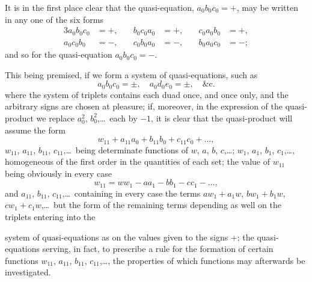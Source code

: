 \documentclass[11pt,a4paper]{book}
\begin{document}
It is in the first place clear that the quasi-equation, $a_0 b_0 c_0 = +$, may be written in any one of the six forms
\begin{alignat*}{3}
a_0 b_0 c_0 &= +, \quad& b_0 c_0 a_0 &= +, \quad& c_0 a_0 b_0 &= +,\\
a_0 c_0 b_0 &= -, \quad& c_0 b_0 a_0 &= -, \quad& b_0 a_0 c_0 &= -;
\end{alignat*}
and so for the quasi-equation $a_0 b_0 c_0 = -$.

\newpage
\setcounter{page}{50}

This being premised, if we form a system of quasi-equations, such as
\[
a_0 b_0 c_0 = \pm, \quad a_0 d_0 e_0 = \pm, \quad \&\text{c.}
\]
where the system of triplets contains each duad once, and once only, and the arbitrary signs are chosen at pleasure; if, moreover, in the expression of the quasi-product we replace $a_0^2$, $b_0^2$,\ldots\ each by $-1$, it is clear that the quasi-product will assume the form
\[
w_{11} + a_{11}a_0 + b_{11}b_0 + c_{11}c_0 + \ldots,
\]
$w_{11}$, $a_{11}$, $b_{11}$, $c_{11}$,\ldots\ being determinate functions of $w$, $a$, $b$, $c$,\ldots; $w_1$, $a_1$, $b_1$, $c_1$,\ldots, homogeneous of the first order in the quantities of each set; the value of $w_{11}$ being obviously in every case
\[
w_{11} = ww_1 - aa_1 - bb_1 - cc_1 - \ldots,
\]
and $a_{11}$, $b_{11}$, $c_{11}$,\ldots\ containing in every case the terms $aw_1+a_1w$, $bw_1+b_1w$, $cw_1+c_1w$,\ldots\ but the form of the remaining terms depending as well on the triplets entering into the

\newpage
\setcounter{page}{51}

system of quasi-equations as on the values given to the signs $+$; the quasi-equations serving, in fact, to prescribe a rule for the formation of certain functions $w_{11}$, $a_{11}$, $b_{11}$, $c_{11}$,\ldots, the properties of which functions may afterwards be investigated.
\end{document}
